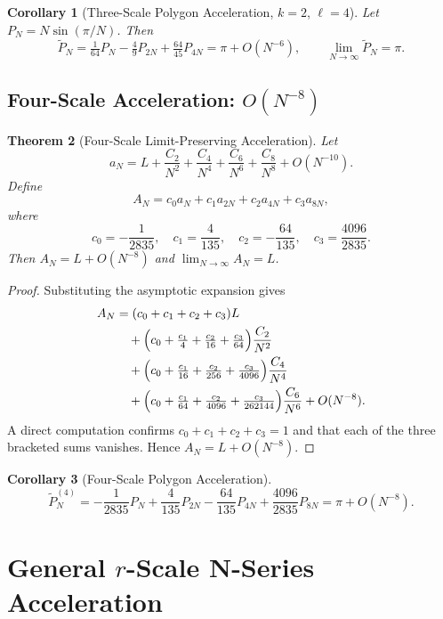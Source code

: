 \documentclass[12pt]{article}
\newtheorem{theorem}{Theorem}[section]
\newtheorem{corollary}[theorem]{Corollary}
\theoremstyle{remark}
\begin{document}
\begin{corollary}[Three-Scale Polygon Acceleration, $k=2$, $\ell=4$]
Let $P_N = N\sin(\pi/N)$. Then
\[
  \widetilde{P}_N
  = \tfrac{1}{64}P_N - \tfrac{4}{9}P_{2N} + \tfrac{64}{45}P_{4N}
  = \pi + O(N^{-6}),\qquad
  \lim_{N\to\infty}\widetilde{P}_N = \pi.
\]
\end{corollary}

\subsection{Four-Scale Acceleration: $O(N^{-8})$}

\begin{theorem}[Four-Scale Limit-Preserving Acceleration]
\label{thm:four-scale}
Let
\[
  a_N = L + \frac{C_2}{N^2} + \frac{C_4}{N^4}
        + \frac{C_6}{N^6} + \frac{C_8}{N^8} + O(N^{-10}).
\]
Define
\[
  A_N = c_0 a_N + c_1 a_{2N} + c_2 a_{4N} + c_3 a_{8N},
\]
where
\[
  c_0 = -\frac{1}{2835},\quad
  c_1 = \frac{4}{135},\quad
  c_2 = -\frac{64}{135},\quad
  c_3 = \frac{4096}{2835}.
\]
Then $A_N = L + O(N^{-8})$ and $\lim_{N\to\infty}A_N = L$.
\end{theorem}

\begin{proof}
Substituting the asymptotic expansion gives
\begin{align*}
  A_N &= (c_0+c_1+c_2+c_3)L \\
      &\quad+ \Bigl(c_0+\tfrac{c_1}{4}+\tfrac{c_2}{16}+\tfrac{c_3}{64}\Bigr)
             \frac{C_2}{N^2} \\
      &\quad+ \Bigl(c_0+\tfrac{c_1}{16}+\tfrac{c_2}{256}+\tfrac{c_3}{4096}\Bigr)
             \frac{C_4}{N^4} \\
      &\quad+ \Bigl(c_0+\tfrac{c_1}{64}+\tfrac{c_2}{4096}
             +\tfrac{c_3}{262144}\Bigr)\frac{C_6}{N^6}
             + O(N^{-8}).
\end{align*}
A direct computation confirms $c_0+c_1+c_2+c_3=1$ and that each of the
three bracketed sums vanishes. Hence $A_N = L + O(N^{-8})$.
\end{proof}

\begin{corollary}[Four-Scale Polygon Acceleration]
\[
  \widetilde{P}_N^{(4)}
  = -\frac{1}{2835}P_N + \frac{4}{135}P_{2N}
    - \frac{64}{135}P_{4N} + \frac{4096}{2835}P_{8N}
  = \pi + O(N^{-8}).
\]
\end{corollary}

\section{General $r$-Scale N-Series Acceleration}
\end{document}
